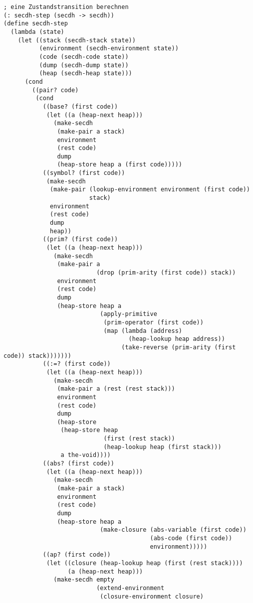 \begin{verbatim}
; eine Zustandstransition berechnen
(: secdh-step (secdh -> secdh))
(define secdh-step
  (lambda (state)
    (let ((stack (secdh-stack state))
          (environment (secdh-environment state))
          (code (secdh-code state))
          (dump (secdh-dump state))
          (heap (secdh-heap state)))
      (cond
        ((pair? code)
         (cond
           ((base? (first code))
            (let ((a (heap-next heap)))
              (make-secdh
               (make-pair a stack)
               environment
               (rest code)
               dump
               (heap-store heap a (first code)))))
           ((symbol? (first code))
            (make-secdh
             (make-pair (lookup-environment environment (first code))
                        stack)
             environment
             (rest code)
             dump
             heap))
           ((prim? (first code))
            (let ((a (heap-next heap)))
              (make-secdh
               (make-pair a
                          (drop (prim-arity (first code)) stack))
               environment
               (rest code)
               dump
               (heap-store heap a
                           (apply-primitive
                            (prim-operator (first code))
                            (map (lambda (address)
                                   (heap-lookup heap address))
                                 (take-reverse (prim-arity (first code)) stack)))))))
           ((:=? (first code))
            (let ((a (heap-next heap)))
              (make-secdh
               (make-pair a (rest (rest stack)))
               environment
               (rest code)
               dump
               (heap-store
                (heap-store heap
                            (first (rest stack)) 
                            (heap-lookup heap (first stack)))
                a the-void))))
           ((abs? (first code))
            (let ((a (heap-next heap)))
              (make-secdh
               (make-pair a stack)
               environment
               (rest code)
               dump
               (heap-store heap a
                           (make-closure (abs-variable (first code))
                                         (abs-code (first code))
                                         environment)))))
           ((ap? (first code))
            (let ((closure (heap-lookup heap (first (rest stack))))
                  (a (heap-next heap)))
              (make-secdh empty
                          (extend-environment
                           (closure-environment closure)

\end{verbatim}
